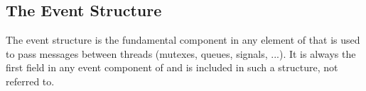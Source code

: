 
%
%

\subsection{The Event Structure}

The event structure is the fundamental component in any element of \oswald
that is used to pass messages between threads (mutexes, queues, signals,
...). It is always the first field in any event component of \oswald and is
included in such a structure, not referred to.

